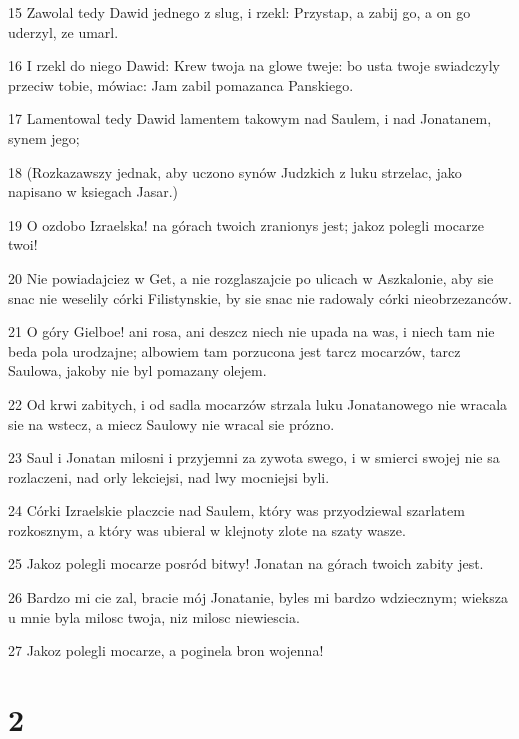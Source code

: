 \par 15 Zawolal tedy Dawid jednego z slug, i rzekl: Przystap, a zabij go, a on go uderzyl, ze umarl.
\par 16 I rzekl do niego Dawid: Krew twoja na glowe tweje: bo usta twoje swiadczyly przeciw tobie, mówiac: Jam zabil pomazanca Panskiego.
\par 17 Lamentowal tedy Dawid lamentem takowym nad Saulem, i nad Jonatanem, synem jego;
\par 18 (Rozkazawszy jednak, aby uczono synów Judzkich z luku strzelac, jako napisano w ksiegach Jasar.)
\par 19 O ozdobo Izraelska! na górach twoich zranionys jest; jakoz polegli mocarze twoi!
\par 20 Nie powiadajciez w Get, a nie rozglaszajcie po ulicach w Aszkalonie, aby sie snac nie weselily córki Filistynskie, by sie snac nie radowaly córki nieobrzezanców.
\par 21 O góry Gielboe! ani rosa, ani deszcz niech nie upada na was, i niech tam nie beda pola urodzajne; albowiem tam porzucona jest tarcz mocarzów, tarcz Saulowa, jakoby nie byl pomazany olejem.
\par 22 Od krwi zabitych, i od sadla mocarzów strzala luku Jonatanowego nie wracala sie na wstecz, a miecz Saulowy nie wracal sie prózno.
\par 23 Saul i Jonatan milosni i przyjemni za zywota swego, i w smierci swojej nie sa rozlaczeni, nad orly lekciejsi, nad lwy mocniejsi byli.
\par 24 Córki Izraelskie placzcie nad Saulem, który was przyodziewal szarlatem rozkosznym, a który was ubieral w klejnoty zlote na szaty wasze.
\par 25 Jakoz polegli mocarze posród bitwy! Jonatan na górach twoich zabity jest.
\par 26 Bardzo mi cie zal, bracie mój Jonatanie, byles mi bardzo wdziecznym; wieksza u mnie byla milosc twoja, niz milosc niewiescia.
\par 27 Jakoz polegli mocarze, a poginela bron wojenna!

\chapter{2}

